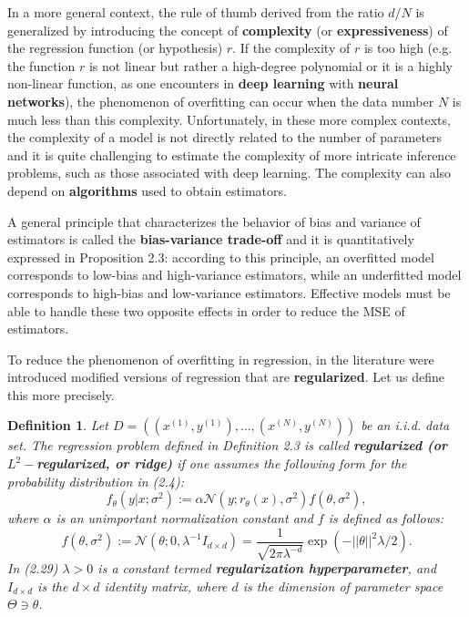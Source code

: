 \documentclass{report}
\newtheorem{definition}{Definition}[chapter]
\begin{document}
In a more general context, the rule of thumb derived from the ratio $d/N$ is generalized by introducing the concept of \textbf{complexity} (or \textbf{expressiveness}) of the regression function (or hypothesis) $r$. If the complexity of $r$ is too high (e.g. the function $r$ is not linear but rather a high-degree polynomial or it is a highly non-linear function, as one encounters in \textbf{deep learning} with \textbf{neural networks}), the phenomenon of overfitting can occur when the data number $N$ is much less than this complexity. Unfortunately, in these more complex contexts, the complexity of a model is not directly related to the number of parameters and it is quite challenging to estimate the complexity of more intricate inference problems, such as those associated with deep learning. The complexity can also depend on \textbf{algorithms} used to obtain estimators.

A general principle that characterizes the behavior of bias and variance of estimators is called the \textbf{bias-variance trade-off} and it is quantitatively expressed in Proposition 2.3: according to this principle, an overfitted model corresponds to low-bias and high-variance estimators, while an underfitted model corresponds to high-bias and low-variance estimators. Effective models must be able to handle these two opposite effects in order to reduce the MSE of estimators.

To reduce the phenomenon of overfitting in regression, in the literature were introduced modified versions of regression that are \textbf{regularized}. Let us define this more precisely.

\begin{definition}
Let $D = ((x^{(1)},y^{(1)}),\dots,(x^{(N)},y^{(N)}))$ be an i.i.d. data set. The regression problem defined in Definition 2.3 is called \textbf{regularized (or $L^2-$regularized, or ridge)} if one assumes the following form for the probability distribution in (2.4):
\begin{equation}
f_\theta(y|x;\sigma^2) := \alpha\mathcal{N}(y;r_\theta(x),\sigma^2)f(\theta, \sigma^2),
\end{equation}
where $\alpha$ is an unimportant normalization constant and $f$ is defined as follows:
\begin{equation}
f(\theta,\sigma^2) := \mathcal{N}(\theta;0,\lambda^{-1}I_{d\times d}) = \frac{1}{\sqrt{2\pi\lambda^{-d}}}\exp(-||\theta||^2\lambda / 2).
\end{equation}
In (2.29) $\lambda > 0$ is a constant termed \textbf{regularization hyperparameter}, and $I_{d\times d}$ is the $d\times d$ identity matrix, where $d$ is the  dimension of parameter space $\Theta \ni \theta$.
\end{definition}
\end{document}
